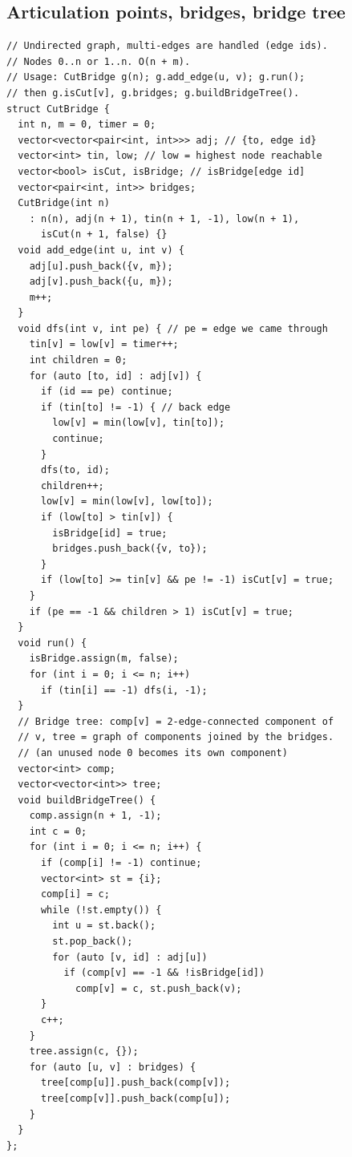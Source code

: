 \documentclass[8pt, a4paper]{article}
\begin{document}
\begin{multicols*}{3}
\subsection{Articulation points, bridges, bridge tree}
\begin{lstlisting}
// Undirected graph, multi-edges are handled (edge ids).
// Nodes 0..n or 1..n. O(n + m).
// Usage: CutBridge g(n); g.add_edge(u, v); g.run();
// then g.isCut[v], g.bridges; g.buildBridgeTree().
struct CutBridge {
  int n, m = 0, timer = 0;
  vector<vector<pair<int, int>>> adj; // {to, edge id}
  vector<int> tin, low; // low = highest node reachable
  vector<bool> isCut, isBridge; // isBridge[edge id]
  vector<pair<int, int>> bridges;
  CutBridge(int n)
    : n(n), adj(n + 1), tin(n + 1, -1), low(n + 1),
      isCut(n + 1, false) {}
  void add_edge(int u, int v) {
    adj[u].push_back({v, m});
    adj[v].push_back({u, m});
    m++;
  }
  void dfs(int v, int pe) { // pe = edge we came through
    tin[v] = low[v] = timer++;
    int children = 0;
    for (auto [to, id] : adj[v]) {
      if (id == pe) continue;
      if (tin[to] != -1) { // back edge
        low[v] = min(low[v], tin[to]);
        continue;
      }
      dfs(to, id);
      children++;
      low[v] = min(low[v], low[to]);
      if (low[to] > tin[v]) {
        isBridge[id] = true;
        bridges.push_back({v, to});
      }
      if (low[to] >= tin[v] && pe != -1) isCut[v] = true;
    }
    if (pe == -1 && children > 1) isCut[v] = true;
  }
  void run() {
    isBridge.assign(m, false);
    for (int i = 0; i <= n; i++)
      if (tin[i] == -1) dfs(i, -1);
  }
  // Bridge tree: comp[v] = 2-edge-connected component of
  // v, tree = graph of components joined by the bridges.
  // (an unused node 0 becomes its own component)
  vector<int> comp;
  vector<vector<int>> tree;
  void buildBridgeTree() {
    comp.assign(n + 1, -1);
    int c = 0;
    for (int i = 0; i <= n; i++) {
      if (comp[i] != -1) continue;
      vector<int> st = {i};
      comp[i] = c;
      while (!st.empty()) {
        int u = st.back();
        st.pop_back();
        for (auto [v, id] : adj[u])
          if (comp[v] == -1 && !isBridge[id])
            comp[v] = c, st.push_back(v);
      }
      c++;
    }
    tree.assign(c, {});
    for (auto [u, v] : bridges) {
      tree[comp[u]].push_back(comp[v]);
      tree[comp[v]].push_back(comp[u]);
    }
  }
};
\end{lstlisting}

\end{multicols*}
\end{document}
